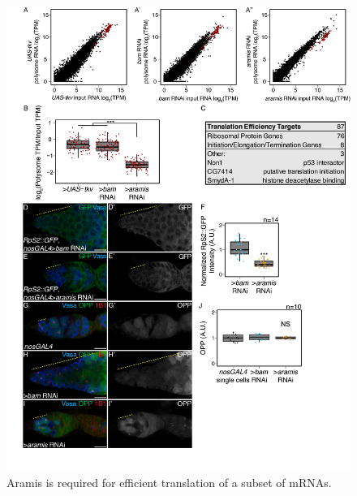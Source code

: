 \documentclass[12pt,oneside]{reedthesis}
\begin{document}
\begin{figure}

{\centering \includegraphics[width=6.5 in,height=8.9375 in]{./figure/Ribosome Biogenesis/Ribosome Biogenesis 4} 

}

\caption[Aramis is required for efficient translation of a subset of mRNAs.]{Aramis is required for efficient translation of a subset of mRNAs.}\label{fig:unnamed-chunk-12}
\end{figure}
\end{document}
